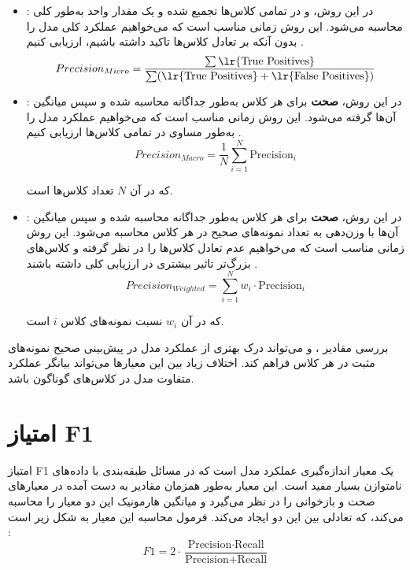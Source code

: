 \begin{itemize}
	\item \textbf{}: در این روش، \textbf{} و \textbf{} در تمامی کلاس‌ها تجمیع شده و یک مقدار واحد به‌طور کلی محاسبه می‌شود. این روش زمانی مناسب است که می‌خواهیم عملکرد کلی مدل را بدون آنکه بر تعادل کلاس‌ها تاکید داشته باشیم، ارزیابی کنیم \cite{ref_sokolova2009}.
	\begin{equation}
		Precision_{Micro} = \frac{\sum \text{\lr{True Positives}}}{\sum (\text{\lr{True Positives}} + \text{\lr{False Positives}})}
	\end{equation}
	\item \textbf{}: در این روش، \textbf{صحت} برای هر کلاس به‌طور جداگانه محاسبه شده و سپس میانگین آن‌ها گرفته می‌شود. این روش زمانی مناسب است که می‌خواهیم عملکرد مدل را به‌طور مساوی در تمامی کلاس‌ها ارزیابی کنیم \cite{ref_sokolova2009}.
	\begin{equation}
		Precision_{Macro} = \frac{1}{N} \sum_{i=1}^{N} \text{Precision}_i
	\end{equation}
	
	که در آن \( N \) تعداد کلاس‌ها است.
	
	\item \textbf{}: در این روش، \textbf{صحت} برای هر کلاس به‌طور جداگانه محاسبه شده و سپس میانگین آن‌ها با وزن‌دهی به تعداد نمونه‌های صحیح در هر کلاس محاسبه می‌شود. این روش زمانی مناسب است که می‌خواهیم عدم تعادل کلاس‌ها را در نظر گرفته و کلاس‌های بزرگ‌تر تاثیر بیشتری در ارزیابی کلی داشته باشند \cite{ref_sokolova2009}.
	\begin{equation}
		Precision_{Weighted} = \sum_{i=1}^{N} w_i \cdot \text{Precision}_i
	\end{equation}
	
	که در آن \( w_i \) نسبت نمونه‌های کلاس \( i \) است.
\end{itemize}

بررسی مقادیر ،  و  می‌تواند درک بهتری از عملکرد مدل در پیش‌بینی صحیح نمونه‌های مثبت در هر کلاس فراهم کند. اختلاف زیاد بین این معیارها می‌تواند بیانگر عملکرد متفاوت مدل در کلاس‌های گوناگون باشد.

\section{امتیاز F1}

امتیاز F1 یک معیار اندازه‌گیری عملکرد مدل است که در مسائل طبقه‌بندی با داده‌های نامتوازن بسیار مفید است. این معیار به‌طور همزمان مقادیر به دست آمده در معیارهای صحت و بازخوانی را در نظر می‌گیرد و میانگین هارمونیک این دو معیار را محاسبه می‌کند، که تعادلی بین این دو ایجاد می‌کند. فرمول محاسبه این معیار به شکل زیر است \cite{ref_manning2008}:
\begin{equation}
	F1 = 2 \cdot \frac{\text{Precision} \cdot \text{Recall}}{\text{Precision} + \text{Recall}}
\end{equation}



